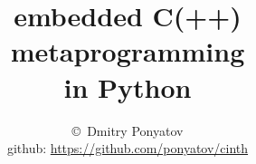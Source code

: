 

\title{embedded C(++) \\metaprogramming \\in Python}

\author{\copyright\ Dmitry Ponyatov \\
github: \url{https://github.com/ponyatov/cinth}}



\maketitle

\tableofcontents






